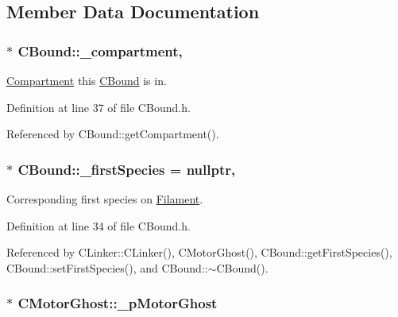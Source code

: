 \subsection{Member Data Documentation}
\hypertarget{classCBound_a95a66719b898cf32e60ae7137186bbbf}{
\subsubsection[{\+\_\+compartment}]{$\ast$ C\+Bound\+::\+\_\+compartment\hspace{0.3cm}{\ttfamily [protected]}, {\ttfamily [inherited]}}}\label{classCBound_a95a66719b898cf32e60ae7137186bbbf}


\hyperlink{classCompartment}{Compartment} this \hyperlink{classCBound}{C\+Bound} is in. 



Definition at line 37 of file C\+Bound.\+h.



Referenced by C\+Bound\+::get\+Compartment().

\hypertarget{classCBound_a7ee4f44fd39c414be1f7b74b1031c1ce}{
\subsubsection[{\+\_\+first\+Species}]{$\ast$ C\+Bound\+::\+\_\+first\+Species = nullptr\hspace{0.3cm}{\ttfamily [protected]}, {\ttfamily [inherited]}}}\label{classCBound_a7ee4f44fd39c414be1f7b74b1031c1ce}


Corresponding first species on \hyperlink{classFilament}{Filament}. 



Definition at line 34 of file C\+Bound.\+h.



Referenced by C\+Linker\+::\+C\+Linker(), C\+Motor\+Ghost(), C\+Bound\+::get\+First\+Species(), C\+Bound\+::set\+First\+Species(), and C\+Bound\+::$\sim$\+C\+Bound().

\hypertarget{classCMotorGhost_a248b8fee5ba1d85c989f666e3a908261}{
\subsubsection[{\+\_\+p\+Motor\+Ghost}]{$\ast$ C\+Motor\+Ghost\+::\+\_\+p\+Motor\+Ghost\hspace{0.3cm}{\ttfamily [private]}}}\label{classCMotorGhost_a248b8fee5ba1d85c989f666e3a908261}


